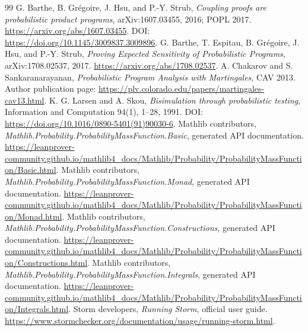 \documentclass[11pt,letterpaper]{article}
\theoremstyle{definition}\newtheorem{definition}[theorem]{Definition}
\theoremstyle{remark}\newtheorem{remark}[theorem]{Remark}
\begin{document}
\begin{thebibliography}{99}
 G. Barthe, B. Gr\'egoire, J. Hsu, and P.-Y. Strub, \emph{Coupling proofs are probabilistic product programs}, arXiv:1607.03455, 2016; POPL 2017. \url{https://arxiv.org/abs/1607.03455}. DOI: \url{https://doi.org/10.1145/3009837.3009896}.
 G. Barthe, T. Espitau, B. Gr\'egoire, J. Hsu, and P.-Y. Strub, \emph{Proving Expected Sensitivity of Probabilistic Programs}, arXiv:1708.02537, 2017. \url{https://arxiv.org/abs/1708.02537}.
 A. Chakarov and S. Sankaranarayanan, \emph{Probabilistic Program Analysis with Martingales}, CAV 2013. Author publication page: \url{https://plv.colorado.edu/papers/martingales-cav13.html}.
 K. G. Larsen and A. Skou, \emph{Bisimulation through probabilistic testing}, Information and Computation 94(1), 1--28, 1991. DOI: \url{https://doi.org/10.1016/0890-5401(91)90030-6}.
 Mathlib contributors, \emph{Mathlib.Probability.ProbabilityMassFunction.Basic}, generated API documentation. \url{https://leanprover-community.github.io/mathlib4_docs/Mathlib/Probability/ProbabilityMassFunction/Basic.html}.
 Mathlib contributors, \emph{Mathlib.Probability.ProbabilityMassFunction.Monad}, generated API documentation. \url{https://leanprover-community.github.io/mathlib4_docs/Mathlib/Probability/ProbabilityMassFunction/Monad.html}.
 Mathlib contributors, \emph{Mathlib.Probability.ProbabilityMassFunction.Constructions}, generated API documentation. \url{https://leanprover-community.github.io/mathlib4_docs/Mathlib/Probability/ProbabilityMassFunction/Constructions.html}.
 Mathlib contributors, \emph{Mathlib.Probability.ProbabilityMassFunction.Integrals}, generated API documentation. \url{https://leanprover-community.github.io/mathlib4_docs/Mathlib/Probability/ProbabilityMassFunction/Integrals.html}.
 Storm developers, \emph{Running Storm}, official user guide. \url{https://www.stormchecker.org/documentation/usage/running-storm.html}.
\end{thebibliography}
\endgroup
\end{document}
